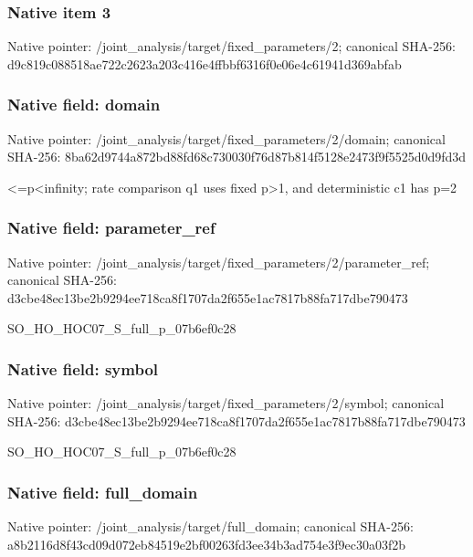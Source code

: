 \documentclass[10pt,a4paper]{article}
\begin{document}
\subsubsection{Native item 3}
Native pointer: /joint\_\allowbreak{}analysis/target/fixed\_\allowbreak{}parameters/2; canonical SHA-256: d9c819c088518ae722c2623a203c416e4ffbbf6316f0e06e4c61941d369abfab

\subsubsection{Native field: domain}
Native pointer: /joint\_\allowbreak{}analysis/target/fixed\_\allowbreak{}parameters/2/domain; canonical SHA-256: 8ba62d9744a872bd88fd68c730030f76d87b814f5128e2473f9f5525d0d9fd3d

\begingroup\raggedright{}<=\allowbreak{}p<infinity;\allowbreak{} rate comparison q1 uses fixed p>1,\allowbreak{} and deterministic c1 has p=\allowbreak{}2\par\endgroup

\subsubsection{Native field: parameter\_\allowbreak{}ref}
Native pointer: /joint\_\allowbreak{}analysis/target/fixed\_\allowbreak{}parameters/2/parameter\_\allowbreak{}ref; canonical SHA-256: d3cbe48ec13be2b9294ee718ca8f1707da2f655e1ac7817b88fa717dbe790473

\begingroup\raggedright\sloppy SO\_\allowbreak{}HO\_\allowbreak{}HOC07\_\allowbreak{}S\_\allowbreak{}full\_\allowbreak{}p\_\allowbreak{}07b6ef0c28\par\endgroup

\subsubsection{Native field: symbol}
Native pointer: /joint\_\allowbreak{}analysis/target/fixed\_\allowbreak{}parameters/2/symbol; canonical SHA-256: d3cbe48ec13be2b9294ee718ca8f1707da2f655e1ac7817b88fa717dbe790473

\begingroup\raggedright\sloppy SO\_\allowbreak{}HO\_\allowbreak{}HOC07\_\allowbreak{}S\_\allowbreak{}full\_\allowbreak{}p\_\allowbreak{}07b6ef0c28\par\endgroup

\subsubsection{Native field: full\_\allowbreak{}domain}
Native pointer: /joint\_\allowbreak{}analysis/target/full\_\allowbreak{}domain; canonical SHA-256: a8b2116d8f43cd09d072eb84519e2bf00263fd3ee34b3ad754e3f9ec30a03f2b
\end{document}
